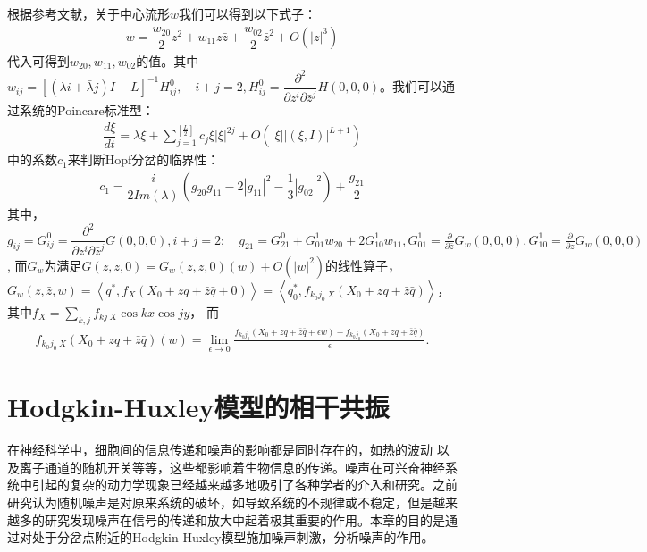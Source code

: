 \documentclass[
    bachelor,
    nofont, %
    pdflinks,
    ]{xjtuthesis}
\begin{document}
根据参考文献\cite{hassard1981theory}，关于中心流形$w$我们可以得到以下式子：
\begin{align}
w=\dfrac{w_{20}}{2}z^2 +w_{11}z\bar{z}+\dfrac{w_{02}}{2}\bar{z}^2 +O(|z|^3)
\end{align}
代入可得到$w_{20},w_{11},w_{02}$的值。其中$w_{ij}=[(\lambda i+\bar{\lambda}j)I-L]^{-1}H^0_{ij},\quad i+j=2, H^0_{ij}=\dfrac{\partial^2}{\partial z^i \partial \bar{z}^j}H(0, 0, 0)$。我们可以通过系统的Poincare标准型：
\begin{align}
\dfrac{d \xi}{dt} =\lambda \xi+\sum_{j=1}^{\left[\frac{L}{2}\right]}c_j \xi|\xi|^{2j}+O(|\xi||(\xi,I)|^{L+1})
\end{align}
中的系数$c_1$来判断Hopf分岔的临界性：
\begin{align}
c_1=\dfrac{i}{2 Im(\lambda)}(g_{20}g_{11}-2|g_{11}|^2-\dfrac{1}{3}|g_{02}|^2)+\dfrac{g_{21}}{2}
\end{align}
其中，$g_{ij}=G^0_{ij}=\dfrac{\partial^2}{\partial z^i \partial \bar{z}^j}G(0, 0, 0), i + j = 2; \quad g_{21}=G^0_{21}+G^1_{01}w_{20}+2G^1_{10}w_{11},G^1_{01}=
\frac{\partial}{\partial \bar{z}} G _w (0, 0, 0), G^1_{10}=
\frac{\partial}{\partial z} G _w (0, 0, 0)$, 而$G _w$为满足$G(z, \bar{z}, 0) = G _w (z, \bar{z}, 0)(w) + O(|w|^2)$的线性算子，$G _w (z, \bar{z}, w) = \left<q ^*, f _X (X_0 + zq + \bar{z}\bar{q} + 0)\right> = \left<q _0 ^*, f _{k _0j _0\ X} (X _0 + zq + \bar{z}\bar{q})\right>$，其中$f _X = \sum _{k,j} f _{kj\ X}\cos kx \cos jy$， 而
\begin{align*}
f _{k _0 j _0\ X} (X _0 + zq + \bar{z}\bar{q}) (w)= \lim _{\epsilon \to 0} \frac{f _{k _0 j _0} (X _0 + zq + \bar{z}\bar{q} + \epsilon w) - f _{k _0 j _0} (X _0 + zq + \bar{z}\bar{q})}{\epsilon}.
\end{align*}

\medskip


\chapter{Hodgkin-Huxley模型的相干共振}

在神经科学中，细胞间的信息传递和噪声的影响都是同时存在的，如热的波动
以及离子通道的随机开关等等，这些都影响着生物信息的传递。噪声在可兴奋神经系统中引起的复杂的动力学现象已经越来越多地吸引了各种学者的介入和研究。之前研究认为随机噪声是对原来系统的破坏，如导致系统的不规律或不稳定，但是越来越多的研究发现噪声在信号的传递和放大中起着极其重要的作用。本章的目的是通过对处于分岔点附近的Hodgkin-Huxley模型施加噪声刺激，分析噪声的作用。
\end{document}

